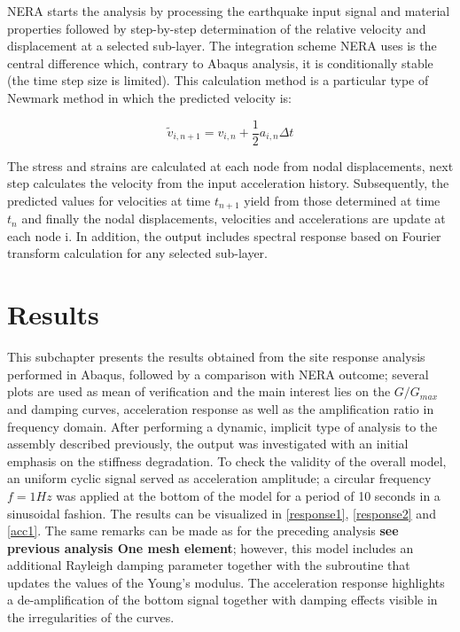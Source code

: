\documentclass[10pt,a4paper]{report}
\begin{document}
NERA starts the analysis by processing the earthquake input signal and material properties followed by step-by-step determination of the relative velocity and displacement at a selected sub-layer. The integration scheme NERA uses is the central difference which, contrary to Abaqus analysis, it is conditionally stable (the time step size is limited). This calculation method is a particular type of Newmark method in which the predicted velocity is:

\begin{equation}
	\tilde{v}_{i,n+1}=v_{i,n}+\frac{1}{2}a_{i,n}\Delta t
\end{equation}

The stress and strains are calculated at each node from nodal displacements, next step calculates the velocity from the input acceleration history. Subsequently, the predicted values for velocities at time $t_{n+1}$ yield from those determined at time $t_n$ and finally the nodal displacements, velocities and accelerations are update at each node i. In addition, the output includes spectral response based on Fourier transform calculation for any selected sub-layer.

\section{Results}
This subchapter presents the results obtained from the site response analysis performed in Abaqus, followed by a comparison with NERA outcome; several plots are used as mean of verification and the main interest lies on the $G/G_{max}$ and damping curves, acceleration response as well as the amplification ratio in frequency domain.
After performing a dynamic, implicit type of analysis to the assembly described previously, the output was investigated with an initial emphasis on the stiffness degradation. To check the validity of the overall model, an uniform cyclic signal served as acceleration amplitude; a circular frequency $f=1 Hz$ was applied at the bottom of the model for a period of 10 seconds in a sinusoidal fashion. The results can be visualized in \ref{response1}, \ref{response2} and \ref{acc1}. The same remarks can be made as for the preceding analysis \textbf{see previous analysis One mesh element}; however, this model includes an additional Rayleigh damping parameter together with the subroutine that updates the values of the Young's modulus. The acceleration response highlights a de-amplification of the bottom signal together with damping effects visible in the irregularities of the curves.
\end{document}

